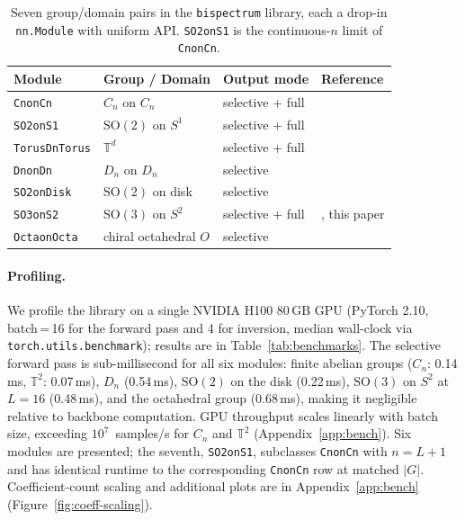 \documentclass{article}
\theoremstyle{definition}
\theoremstyle{remark}
\newcommand{\SO}{\mathrm{SO}}
\theoremstyle{definition}
\begin{document}
\begin{table}[tbp]
  \caption{Seven group/domain pairs in the \texttt{bispectrum} library,
    each a drop-in \texttt{nn.Module} with uniform API.
    \texttt{SO2onS1} is the continuous-$n$ limit of \texttt{CnonCn}.}
  \label{tab:supported-groups}
  \centering
  \small
  \begin{tabular*}{\linewidth}{@{\extracolsep{\fill}}llll@{}}
    \toprule
    Module & Group / Domain & Output mode & Reference \\
    \midrule
    \texttt{CnonCn} & $C_n$ on $C_n$ & selective + full & \citep{sanborn2023bispectral} \\
    \texttt{SO2onS1} & $\SO(2)$ on $S^1$ & selective + full & \citep{mataigne2024selective} \\
    \texttt{TorusDnTorus} & $\mathbb{T}^d$ & selective + full & \citep{mataigne2024selective} \\
    \texttt{DnonDn} & $D_n$ on $D_n$ & selective & \citep{mataigne2024selective} \\
    \texttt{SO2onDisk} & $\SO(2)$ on disk & selective & \citep{myers2025selective} \\
    \texttt{SO3onS2} & $\SO(3)$ on $S^2$ & selective + full & \citep{kakarala2012bispectrum}, this paper \\
    \texttt{OctaonOcta} & chiral octahedral $O$ & selective & \citep{mataigne2024selective} \\
    \bottomrule
  \end{tabular*}
\end{table}



\paragraph{Profiling.} \label{sec:benchmarks} We profile the library on a single NVIDIA H100 80\,GB GPU
(PyTorch 2.10, batch\,=\,16 for the forward pass and 4 for inversion,
median wall-clock via \texttt{torch.utils.benchmark}); results are in
Table~\ref{tab:benchmarks}.
The selective forward pass is sub-millisecond for all six modules:
finite abelian groups ($C_n$: 0.14\,ms, $\mathbb{T}^2$: 0.07\,ms),
$D_n$ (0.54\,ms), $\mathrm{SO}(2)$ on the disk (0.22\,ms),
$\mathrm{SO}(3)$ on $S^2$ at $L{=}16$ (0.48\,ms), and the octahedral
group (0.68\,ms), making it negligible relative to backbone computation.
GPU throughput scales linearly with batch size, exceeding
$10^7$~samples/s for $C_n$ and $\mathbb{T}^2$
(Appendix~\ref{app:bench}). Six modules are presented; the seventh,
\texttt{SO2onS1}, subclasses \texttt{CnonCn} with $n = L{+}1$ and has
identical runtime to the corresponding \texttt{CnonCn} row at matched
$|G|$. Coefficient-count scaling and additional plots are in
Appendix~\ref{app:bench} (Figure~\ref{fig:coeff-scaling}).
\end{document}
